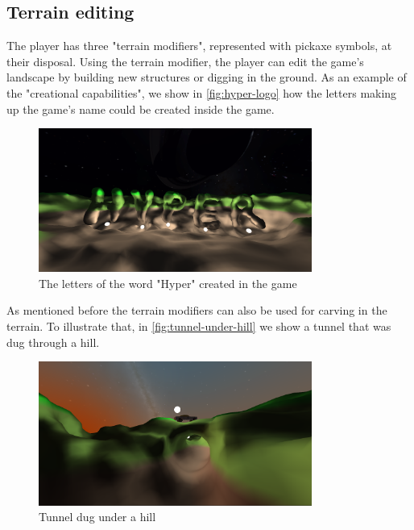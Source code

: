 \subsection{Terrain editing}
The player has three "terrain modifiers", represented with pickaxe symbols, at their disposal.
Using the terrain modifier, the player can edit the game's landscape by building new structures or digging in the ground.
As an example of the "creational capabilities", we show in \autoref{fig:hyper-logo} how the letters making up the game's name could be created inside the game.
\begin{figure}[h]
    \centering
    \includegraphics[width=0.8\textwidth]{chapters/results/sections/gameplay/resources/hyper-logo-night-2.png}
    \caption{The letters of the word "Hyper" created in the game}
    \label{fig:hyper-logo}
\end{figure}

As mentioned before the terrain modifiers can also be used for carving in the terrain.
To illustrate that, in \autoref{fig:tunnel-under-hill} we show a tunnel that was dug through a hill.
\begin{figure}[h]
    \centering
    \includegraphics[width=0.8\textwidth]{chapters/results/sections/gameplay/resources/tunnel-with-car.png}
    \caption{Tunnel dug under a hill}
    \label{fig:tunnel-under-hill}
\end{figure}


